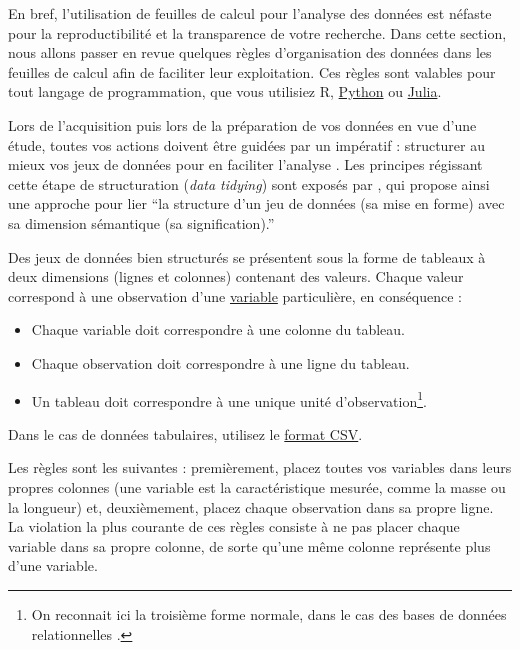 \documentclass[
  french,
]{scrbook}
\providecommand{\tightlist}{%
  \setlength{\itemsep}{0pt}\setlength{\parskip}{0pt}}
\begin{document}
En bref, l'utilisation de feuilles de calcul pour l'analyse des données est néfaste pour la reproductibilité et la transparence de votre recherche. Dans cette section, nous allons passer en revue quelques règles d'organisation des données dans les feuilles de calcul afin de faciliter leur exploitation. Ces règles sont valables pour tout langage de programmation, que vous utilisiez R, \href{https://www.python.org/}{Python} ou \href{https://juliastats.org/}{Julia}.

Lors de l'acquisition puis lors de la préparation de vos données en vue d'une étude, toutes vos actions doivent être guidées par un impératif : structurer au mieux vos jeux de données pour en faciliter l'analyse \autocite{wickham2014}. Les principes régissant cette étape de structuration (\emph{data tidying}) sont exposés par \textcite{wickham2014}, qui propose ainsi une approche pour lier ``la structure d'un jeu de données (sa mise en forme) avec sa dimension sémantique (sa signification).''

Des jeux de données bien structurés se présentent sous la forme de tableaux à deux dimensions (lignes et colonnes) contenant des valeurs. Chaque valeur correspond à une observation d'une \protect\hyperlink{variables}{variable} particulière, en conséquence :

\begin{itemize}
\tightlist
\item
  Chaque variable doit correspondre à une colonne du tableau.
\item
  Chaque observation doit correspondre à une ligne du tableau.
\item
  Un tableau doit correspondre à une unique unité d'observation\footnote{On reconnait ici la troisième forme normale, dans le cas des bases de données relationnelles \autocite{wickham2014}.}.
\end{itemize}

\begin{tcolorbox}[fonttitle=\sffamily\bfseries\large,title=Conseil,colframe=darkcyan]

Dans le cas de données tabulaires, utilisez le \protect\hyperlink{csv}{format CSV}.

\end{tcolorbox}

Les règles sont les suivantes : premièrement, placez toutes vos variables dans leurs propres colonnes (une variable est la caractéristique mesurée, comme la masse ou la longueur) et, deuxièmement, placez chaque observation dans sa propre ligne. La violation la plus courante de ces règles consiste à ne pas placer chaque variable dans sa propre colonne, de sorte qu'une même colonne représente plus d'une variable.
\end{document}
